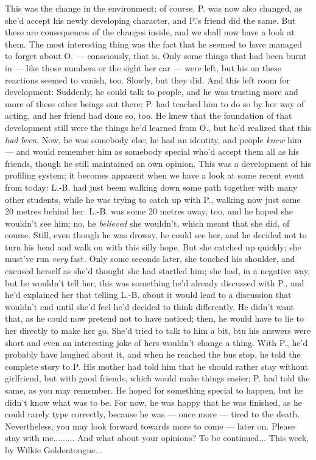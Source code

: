 This was the change in the environment; of course, P. was now also changed, as she'd accept his newly developing character, and P.'s friend did the same. But these are consequences of the changes inside, and we shall now have a look at them. 
The most interesting thing was the fact that he seemed to have managed to forget about O. --- consciously, that is. Only some things that had been burnt in --- like those numbers or the sight her car --- were left, but his on these reactions seemed to vanish, too. Slowly, but they did. 
And this left room for development: Suddenly, he could talk to people, and he was trusting more and more of these other beings out there; P. had teached him to do so by her way of acting, and her friend had done so, too. He knew that the foundation of that development still were the things he'd learned from O., but he'd realized that this \emph{had been}. Now, he was somebody else; he had an identity, and people \emph{knew} him --- and would remember him as somebody special who'd accept them all as his friends, though he still maintained an own opinion. This was a development of his profiling system; it becomes apparent when we have a look at some recent event from today: L.-B. had just beem walking down some path together with many other students, while he was trying to catch up with P., walking now just some 20 metres behind her. L.-B. was some 20 metres away, too, and he hoped she wouldn't see him; no, he \emph{believed} she wouldn't, which meant that she did, of course. Still, even though he was drowsy, he could see her, and he decided not to turn his head and walk on with this silly hope. 
But she catched up quickly; she must've run \emph{very} fast. Only some seconds later, she touched his shoulder, and excused herself as she'd thought she had startled him; she had, in a negative way, but he wouldn't tell her; this was something he'd already discussed with P., and he'd explained her that telling L.-B. about it would lead to a discussion that wouldn't end until she'd feel he'd decided to think differently. He didn't want that, as he could now pretend not to have noticed; then, he would have to lie to her directly to make her go. 
She'd tried to talk to him a bit, btu his answers were short and even an interesting joke of hers wouldn't change a thing. With P., he'd probably have laughed about it, and when he reached the bus stop, he told the complete story to P. 
His mother had told him that he should rather stay without girlfriend, but with good friends, which would make things easier; P. had told the same, as you may remember. He hoped for something special to happen, but he didn't know what was to be. 
For now, he was happy that he was finished, as he could rarely type correctly, because he was --- once more --- tired to the death. 
Nevertheless, you may look forward towards more to come --- later on. 
Please stay with me.........
And what about your opinions?
To be continued...
This week, by Wilkie Goldentongue...

